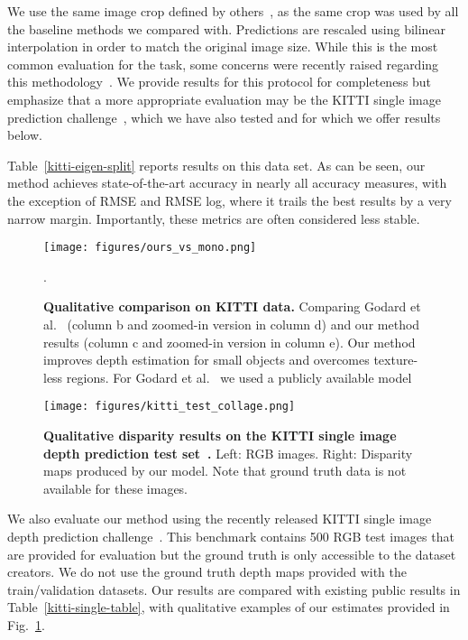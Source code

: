 \documentclass[10pt,twocolumn,letterpaper]{article}
\newcommand{\minisection}[1]{\vspace{1mm}\noindent{\textbf{#1}}}
\begin{document}
We use the same image crop defined by others~\cite{garg2016unsupervised}, as the same crop was used by all the baseline methods we compared with. Predictions are rescaled using bilinear interpolation in order to match the original image size. While this is the most common evaluation for the task, some concerns were recently raised regarding this methodology~\cite{godard2018digging}. We provide results for this protocol for completeness but emphasize that a more appropriate evaluation may be the KITTI single image prediction challenge~\cite{uhrig2017sparsity}, which we have also tested and for which we offer results below.

Table~\ref{kitti-eigen-split} reports results on this data set. As can be seen, our method achieves state-of-the-art accuracy in nearly all accuracy measures, with the exception of RMSE and RMSE log, where it trails the best results by a very narrow margin. Importantly, these metrics are often considered less stable.

\begin{figure*}
	\centering
	\texttt{[image: figures/ours\_vs\_mono.png]}
	\caption{{\bf Qualitative comparison on KITTI data.} Comparing Godard et al.~\cite{monodepth17} (column b and zoomed-in version in column d) and our method results (column c and zoomed-in version in column e). Our method improves depth estimation for small objects and overcomes texture-less regions. For Godard et al.~\cite{monodepth17} we used a publicly available model~\cite{city2eigen_resnet}}.
\end{figure*}


\begin{figure}[t]
	\centering
	\texttt{[image: figures/kitti\_test\_collage.png]}
	\caption{{\bf Qualitative disparity results on the KITTI single image depth prediction test set~\cite{uhrig2017sparsity}.} Left: RGB images. Right: Disparity maps produced by our model. Note that ground truth data is not available for these images.\vspace{-2mm}}
	\label{fig:kitti_test}
\end{figure}

\minisection{KITTI Single image depth benchmark.}
We also evaluate our method using the recently released KITTI single image depth prediction challenge~\cite{uhrig2017sparsity}. This benchmark contains 500 RGB test images that are provided for evaluation but the ground truth is only accessible to the dataset creators. We do not use the ground truth depth maps provided with the train/validation datasets. Our results are compared with existing public results in Table~\ref{kitti-single-table}, with qualitative examples of our estimates provided in Fig.~\ref{fig:kitti_test}.
\end{document}
